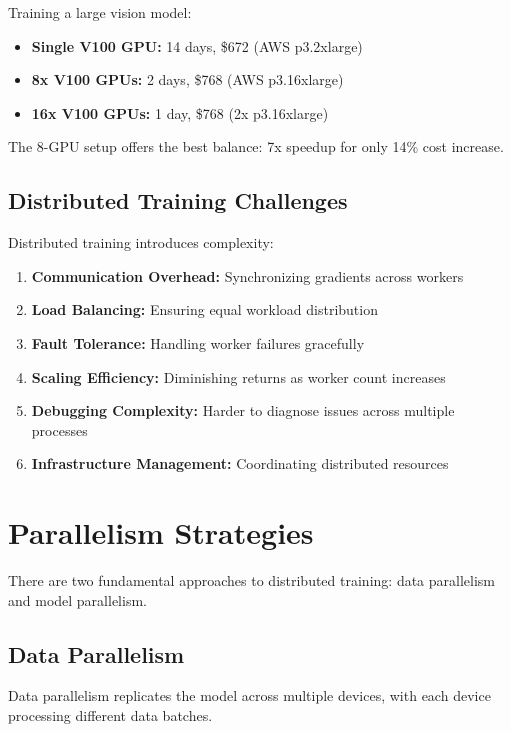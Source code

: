 \begin{example}
Training a large vision model:
\begin{itemize}
    \item \textbf{Single V100 GPU:} 14 days, \$672 (AWS p3.2xlarge)
    \item \textbf{8x V100 GPUs:} 2 days, \$768 (AWS p3.16xlarge)
    \item \textbf{16x V100 GPUs:} 1 day, \$768 (2x p3.16xlarge)
\end{itemize}

The 8-GPU setup offers the best balance: 7x speedup for only 14\% cost increase.
\end{example}

\subsection{Distributed Training Challenges}

Distributed training introduces complexity:

\begin{enumerate}
    \item \textbf{Communication Overhead:} Synchronizing gradients across workers
    \item \textbf{Load Balancing:} Ensuring equal workload distribution
    \item \textbf{Fault Tolerance:} Handling worker failures gracefully
    \item \textbf{Scaling Efficiency:} Diminishing returns as worker count increases
    \item \textbf{Debugging Complexity:} Harder to diagnose issues across multiple processes
    \item \textbf{Infrastructure Management:} Coordinating distributed resources
\end{enumerate}

\section{Parallelism Strategies}

There are two fundamental approaches to distributed training: data parallelism and model parallelism.

\subsection{Data Parallelism}

Data parallelism replicates the model across multiple devices, with each device processing different data batches.

